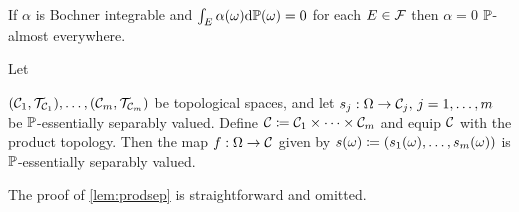 \label{lem:gotoae}
If $\alpha$ is  Bochner integrable and  $\int_E \alpha(\omega) \mathrm{d}\mathbb P(\omega) = 0 $ for each $E \in \mathcal F$ then $\alpha=0$ $\mathbb P$-almost everywhere.
\ele

\label{lem:prodsep}
Let 

\noindent $\mleft(\cCo,\Top{\cCo}\mright),\ldots,\mleft(\cCm,\Top{\cCm}\mright)$ be topological spaces, and let $s_j:\Omega\rightarrow\mathcal C_{j},\,j=1,\ldots,m$ be $\mathbb P$-essentially separably valued. Define $\mathcal C \coloneqq \mathcal C_{1} \times \cdots \times \mathcal C_{m}$ and equip $\mathcal C$ with the product topology. Then the map $f:\Omega\rightarrow \mathcal C$ given by $s(\omega) \de \mleft(s_1(\omega),\ldots,s_m(\omega)\mright) $ is $\mathbb P$-essentially separably valued.
\ele

The proof of \cref{lem:prodsep} is straightforward and omitted.
